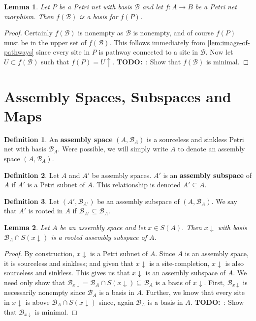\documentclass[aps,prd,onecolumn,nofootinbib,letterpaper,preprintnumbers,superscriptaddress,eqsecnum]{revtex4}
\newtheorem{lemma}{Lemma}
\theoremstyle{definition}
\newtheorem{definition}{Definition}
\newcommand{\upset}[1]{#1\!\!\uparrow}
\newcommand{\downset}[1]{#1\!\!\downarrow}
\newcommand{\B}{\mathcal{B}}
\newcommand{\TODO}{\noindent\textbf{TODO:}~}
\begin{document}
\begin{lemma}\label{lem:image-basis}
    Let $P$ be a Petri net with basis $\B$ and let $f : A \rightarrow B$ be a Petri net morphism.
    Then $f(\B)$ is a basis for $f(P)$.
\end{lemma}
\begin{proof}
    Certainly $f(\B)$ is nonempty as $\B$ is nonempty, and of course $f(P)$ must be in the upper set of $f(\B)$.
    This follows immediately from \cref{lem:image-of-pathways} since every site in $P$ is pathway connected to a site in $\B$.
    Now let $U \subset f(\B)$ such that $f(P) = \upset{U}$.
    \TODO: Show that $f(\B)$ is minimal.
\end{proof}

\section{Assembly Spaces, Subspaces and Maps}

\begin{definition}\label{def:assembly-space}
    An \textbf{assembly space} $(A, \B_A)$ is a sourceless and sinkless Petri net with basis $\B_A$.
    Were possible, we will simply write $A$ to denote an assembly space $(A, \B_A)$.
\end{definition}

\begin{definition}\label{def:assembly-subspace}
    Let $A$ and $A'$ be assembly spaces.
    $A'$ is an \textbf{assembly subspace} of $A$ if $A'$ is a Petri subnet of $A$.
    This relationship is denoted $A' \subseteq A$.
\end{definition}

\begin{definition}\label{def:rooted}
    Let $(A', \B_{A'})$ be an assembly subspace of $(A, \B_A)$.
    We say that $A'$ is rooted in $A$ if $\B_{A'} \subseteq \B_A$.
\end{definition}

\begin{lemma}\label{lem:lower-is-rooted}
    Let $A$ be an assembly space and let $x \in S(A)$.
    Then $\downset{x}$ with basis $\B_A \cap S(\downset{x})$ is a rooted assembly subspace of $A$.
\end{lemma}
\begin{proof}
    By construction, $\downset{x}$ is a Petri subnet of $A$.
    Since $A$ is an assembly space, it is sourceless and sinkless; and given that $\downset{x}$ is a site-completion, $\downset{x}$ is also sourceless and sinkless.
    This gives us that $\downset{x}$ is an assembly subspace of $A$.
    We need only show that $\B_{x\downarrow} = \B_A \cap S(\downset{x}) \subseteq \B_A$ is a basis of $\downset{x}$.
    First, $\B_{x\downarrow}$ is necessarily nonempty since $\B_A$ is a basis in $A$.
    Further, we know that every site in $\downset{x}$ is above $\B_A \cap S(\downset{x})$ since, again $\B_A$ is a basis in $A$.
    \TODO: Show that $\B_{x\downarrow}$ is minimal.
\end{proof}
\end{document}
